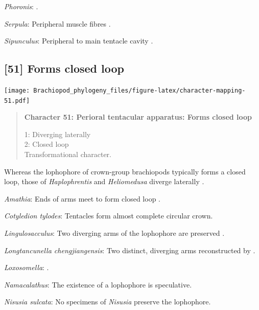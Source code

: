 \documentclass[openany]{book}
\begin{document}
\hypertarget{Phoronis-coding-50}{}
\emph{Phoronis}: \citep{Pardos1991}.

\hypertarget{Serpula-coding-50}{}
\emph{Serpula}: Peripheral muscle fibres \citep{Hanson1949}.

\hypertarget{Sipunculus-coding-50}{}
\emph{Sipunculus}: Peripheral to main tentacle cavity
\citep{Pilger1982}.

\subsection*{{[}51{]} Forms closed loop}\label{forms-closed-loop}

\texttt{[image: Brachiopod\_phylogeny\_files/figure-latex/character-mapping-51.pdf]}

\begin{quote}
\textbf{Character 51: Perioral tentacular apparatus: Forms closed loop}

1: Diverging laterally\\
2: Closed loop\\
Transformational character.
\end{quote}

Whereas the lophophore of crown-group brachiopods typically forms a
closed loop, those of \emph{Haplophrentis} and \emph{Heliomedusa}
diverge laterally \citep{Moysiuk2017Hyolithsare}.

\hypertarget{Amathia-coding-51}{}
\emph{Amathia}: Ends of arms meet to form closed loop
\citep{Temereva2016Thenervous}.

\hypertarget{Cotyledion_tylodes-coding-51}{}
\emph{Cotyledion tylodes}: Tentacles form almost complete circular
crown.

\hypertarget{Lingulosacculus-coding-51}{}
\emph{Lingulosacculus}: Two diverging arms of the lophophore are
preserved \citep{Balthasar2009EarlyCambrian}.

\hypertarget{Longtancunella_chengjiangensis-coding-51}{}
\emph{Longtancunella chengjiangensis}: Two distinct, diverging arms
reconstructed by \citet{Zhang2007Agregarious}.

\hypertarget{Loxosomella-coding-51}{}
\emph{Loxosomella}: \citet{Nielsen1966}.

\hypertarget{Namacalathus-coding-51}{}
\emph{Namacalathus}: The existence of a lophophore is speculative.

\hypertarget{Nisusia_sulcata-coding-51}{}
\emph{Nisusia sulcata}: No specimens of \emph{Nisusia} preserve the
lophophore.
\end{document}

